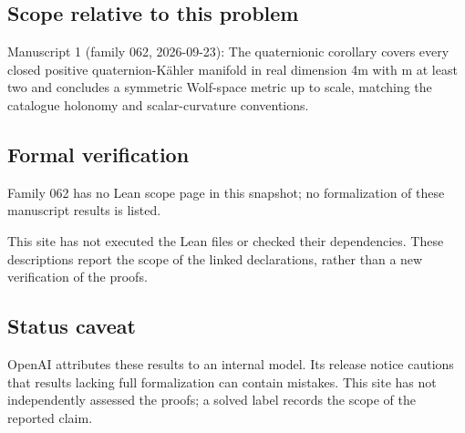 \documentclass[11pt]{article}
\begin{document}
\subsection{Scope relative to this problem}
Manuscript 1 (family 062, 2026-09-23): The quaternionic corollary covers every closed positive quaternion-Kähler manifold in real dimension 4m with m at least two and concludes a symmetric Wolf-space metric up to scale, matching the catalogue holonomy and scalar-curvature conventions.

\subsection{Formal verification}
Family 062 has no Lean scope page in this snapshot; no formalization of these manuscript results is listed.

This site has not executed the Lean files or checked their dependencies. These descriptions report the scope of the linked declarations, rather than a new verification of the proofs.

\subsection{Status caveat}
OpenAI attributes these results to an internal model. Its release notice cautions that results lacking full formalization can contain mistakes. This site has not independently assessed the proofs; a solved label records the scope of the reported claim.
\end{document}
